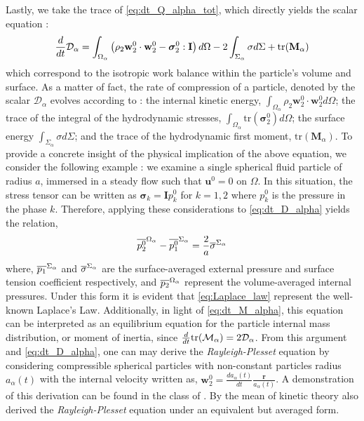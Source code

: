 Lastly, we take the trace of \ref{eq:dt_Q_alpha_tot}, which directly yields the scalar equation :
\begin{equation}
    \frac{d}{d t} \mathcal{D}_\alpha
    = \int_{\Omega_\alpha} \left(
        \rho_2 \textbf{w}_2^0 \cdot \textbf{w}_2^0
        - \bm{\sigma}_2^0 : \textbf{I}
        \right) d\Omega
        - 2\int_{\Sigma_\alpha} \sigma d\Sigma
        + \text{tr}(\textbf{M}_\alpha)
    \label{eq:dt_D_alpha}
\end{equation}
which correspond to the isotropic work balance within the particle's volume and surface. 
As a matter of fact, the rate of compression of a particle, denoted by the scalar $\mathcal{D}_\alpha$ evolves according to : 
the internal kinetic energy, $\int_{\Omega_\alpha}\rho_2 \textbf{w}_2^0 \cdot \textbf{w}_2^0 d\Omega$;
the trace of the integral of the hydrodynamic stresses, $\int_{\Omega_\alpha} \text{tr}(\bm{\sigma}_2^0)d\Omega$; 
the surface energy $\int_{\Sigma_\alpha} \sigma d\Sigma$; 
and the trace of the hydrodynamic first moment, $\text{tr}(\textbf{M}_\alpha)$.
To provide a concrete insight of the physical implication of the above equation, we consider the following example :
we examine a single spherical fluid particle of radius $a$, immersed in a steady flow such that $\textbf{u}^0 = 0$ on $\Omega$. 
In this situation, the stress tensor can be written as $\bm{\sigma}_k = \textbf{I} p_k^0$ for $k = 1, 2$ where $p_k^0$ is the pressure in the phase $k$. 
Therefore, applying these considerations to \ref{eq:dt_D_alpha} yields the relation, 
\begin{equation*}
    \overline{p_2^0}^{\Omega_\alpha} 
    - \overline{p_1^0}^{\Sigma_\alpha}
    =
    \frac{2}{a} \overline{\sigma}^{\Sigma_\alpha}
    \label{eq:Laplace_law}
\end{equation*}
where,  $\overline{p_1}^{\Sigma_\alpha}$ and  $\overline{\sigma}^{\Sigma_\alpha}$ are the surface-averaged external pressure and surface tension coefficient respectively, and $\overline{p_2}^{\Omega_\alpha}$ represent the volume-averaged internal pressures.
Under this form it is evident that \ref{eq:Laplace_law} represent the well-known Laplace's Law. 
Additionally, in light of \ref{eq:dt_M_alpha}, this equation can be interpreted as an equilibrium equation for the particle internal mass distribution, or moment of inertia, since $\frac{d}{d t}\text{tr}(\mathcal{M}_\alpha) = 2 \mathcal{D}_\alpha$. 
From this argument and \ref{eq:dt_D_alpha}, one can may derive the \textit{Rayleigh-Plesset} equation by considering compressible spherical particles with non-constant particles radius $a_\alpha(t)$ with the internal velocity written as, $\textbf{w}^0_2 = \frac{d a_\alpha(t)}{dt}  \frac{\textbf{r}}{a_\alpha(t)}$. 
A demonstration of this derivation can be found in the class of . 
By the mean of kinetic theory \citet{zhang1994averaged} also derived the \textit{Rayleigh-Plesset} equation under an equivalent but averaged form.

